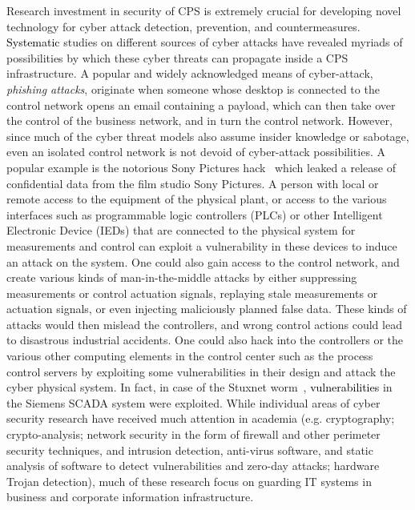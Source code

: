 \noindent
Research investment in security of CPS is 
extremely crucial for developing novel technology for cyber attack detection, prevention, and countermeasures. \textcolor{black} {Systematic} studies on different sources of cyber attacks have revealed myriads of possibilities by which these cyber threats can 
propagate inside a CPS infrastructure. A popular and widely acknowledged means of cyber-attack, {\em phishing attacks}, originate when someone whose desktop
is connected to the control network opens an email containing a payload, which can then
take over the control of the business network, and in turn the control network. However, since
much of the cyber threat models also assume insider knowledge or sabotage, even an isolated
control network is not devoid of cyber-attack possibilities. A popular example  is the notorious Sony Pictures hack~\cite{SonyHack2014} which leaked a release of confidential data from the film studio Sony Pictures. A person with local or remote access
to the equipment of the physical plant, or access to the various interfaces such as programmable
logic controllers (PLCs) or other Intelligent Electronic Device (IEDs) that are connected to the
physical system for measurements and control can exploit a vulnerability in these devices to
induce an attack on the system. One could also gain access to the control network, and create
various kinds of man-in-the-middle attacks by either suppressing measurements or control
actuation signals, replaying stale measurements or actuation signals, or even injecting
maliciously planned false data. These kinds of attacks would then mislead the controllers, and
wrong control actions could lead to disastrous industrial accidents. One could also hack into the
controllers or the various other computing elements in the control center such as the process control servers by
exploiting some vulnerabilities in their design and attack the cyber physical system. In fact, in
case of the Stuxnet worm~\cite{stuxnet}, \textcolor{black} {vulnerabilities} in the Siemens SCADA system were exploited. While individual areas of cyber security research have received
much attention in academia (e.g. cryptography; crypto-analysis; network
security in the form of firewall and other perimeter security techniques, and intrusion detection, anti-virus software, and static analysis of software to detect vulnerabilities and zero-day attacks;
hardware Trojan detection), much of these research focus on guarding IT systems in business and corporate information infrastructure. \\ 

